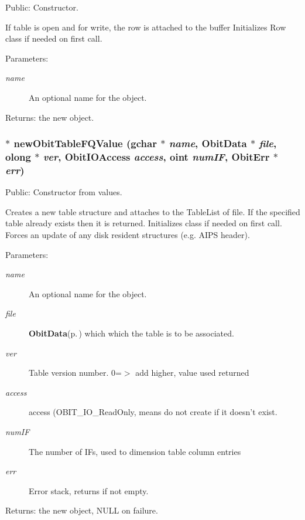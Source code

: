 Public: Constructor. 

If table is open and for write, the row is attached to the buffer Initializes Row class if needed on first call. \begin{Desc}
\item[Parameters:]
\begin{description}
\item[{\em name}]An optional name for the object. \end{description}
\end{Desc}
\begin{Desc}
\item[Returns:]the new object. \end{Desc}
\subsubsection{$\ast$ new\-Obit\-Table\-FQValue (gchar $\ast$ {\em name}, {\bf Obit\-Data} $\ast$ {\em file}, {\bf olong} $\ast$ {\em ver}, Obit\-IOAccess {\em access}, {\bf oint} {\em num\-IF}, {\bf Obit\-Err} $\ast$ {\em err})}\label{ObitTableFQ_8h_a12}


Public: Constructor from values. 

Creates a new table structure and attaches to the Table\-List of file. If the specified table already exists then it is returned. Initializes class if needed on first call. Forces an update of any disk resident structures (e.g. AIPS header). \begin{Desc}
\item[Parameters:]
\begin{description}
\item[{\em name}]An optional name for the object. \item[{\em file}]{\bf Obit\-Data}{\rm (p.\,\pageref{structObitData})} which which the table is to be associated. \item[{\em ver}]Table version number. 0=$>$ add higher, value used returned \item[{\em access}]access (OBIT\_\-IO\_\-Read\-Only, means do not create if it doesn't exist. \item[{\em num\-IF}]The number of IFs, used to dimension table column entries \item[{\em err}]Error stack, returns if not empty. \end{description}
\end{Desc}
\begin{Desc}
\item[Returns:]the new object, NULL on failure. \end{Desc}
